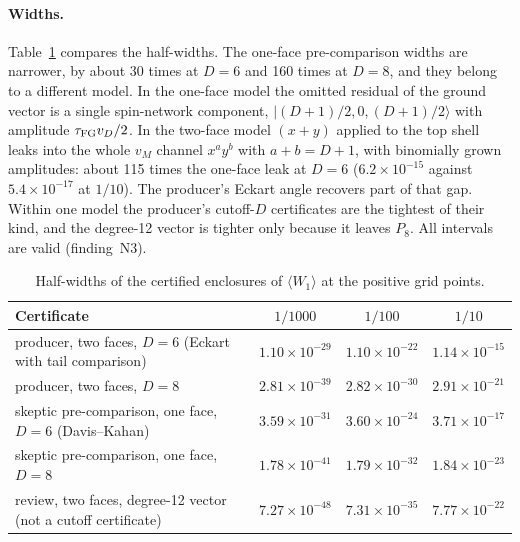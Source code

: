 \paragraph{Widths.}
Table~\ref{tab:az2-widths} compares the half-widths. The one-face
pre-comparison widths are narrower, by about 30 times at $D=6$ and 160 times
at $D=8$, and they belong to a different model. In the one-face model the
omitted residual of the ground vector is a single spin-network component,
$\lvert(D+1)/2,0,(D+1)/2\rangle$ with amplitude $\tau_{\mathrm{FG}} v_D/2$. In the
two-face model $(x+y)$ applied to the top shell leaks into the whole $v_M$
channel $x^ay^b$ with $a+b=D+1$, with binomially grown amplitudes: about 115
times the one-face leak at $D=6$ ($6.2\times10^{-15}$ against
$5.4\times10^{-17}$ at $1/10$). The producer's Eckart angle recovers part of
that gap. Within one model the producer's cutoff-$D$ certificates are the
tightest of their kind, and the degree-12 vector is tighter only because it
leaves $P_8$. All intervals are valid (finding~N3).

\begin{table}[htbp]
\centering\small
\caption{Half-widths of the certified enclosures of $\langle W_1\rangle$ at the
positive grid points.}
\label{tab:az2-widths}
\begin{tabularx}{\linewidth}{@{}>{\raggedright\arraybackslash}X ccc@{}}
\toprule
Certificate & $1/1000$ & $1/100$ & $1/10$\\
\midrule
producer, two faces, $D=6$ (Eckart with tail comparison) & $1.10\times10^{-29}$ & $1.10\times10^{-22}$ & $1.14\times10^{-15}$\\
producer, two faces, $D=8$ & $2.81\times10^{-39}$ & $2.82\times10^{-30}$ & $2.91\times10^{-21}$\\
skeptic pre-comparison, one face, $D=6$ (Davis--Kahan) & $3.59\times10^{-31}$ & $3.60\times10^{-24}$ & $3.71\times10^{-17}$\\
skeptic pre-comparison, one face, $D=8$ & $1.78\times10^{-41}$ & $1.79\times10^{-32}$ & $1.84\times10^{-23}$\\
review, two faces, degree-12 vector (not a cutoff certificate) & $7.27\times10^{-48}$ & $7.31\times10^{-35}$ & $7.77\times10^{-22}$\\
\bottomrule
\end{tabularx}
\end{table}

